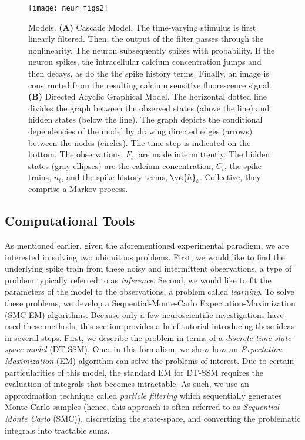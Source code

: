 \begin{figure}
\centering
\texttt{[image: neur\_figs2]}
\caption[Models]{Models.  \textbf{(A)} Cascade Model. The time-varying stimulus is first linearly filtered.  Then, the output of the filter passes through the nonlinearity.  The neuron subsequently spikes with probability.  If the neuron spikes, the intracellular calcium concentration jumps and then decays, as do the the spike history terms. Finally, an image is constructed from the resulting calcium sensitive fluorescence signal.  \textbf{(B)} Directed Acyclic Graphical Model. The horizontal dotted line divides the graph between the observed states (above the line) and hidden states (below the line). The graph depicts the conditional dependencies of the model by drawing directed edges (arrows) between the nodes (circles). The time step is indicated on the bottom.  The observations, $F_t$, are made intermittently. The hidden states (gray ellipses) are the calcium concentration, $C_t$, the spike trains, $n_t$, and the spike history terms, $\ve{h}_t$. Collective, they comprise a  Markov process.}
\label{fig:mod}
\end{figure}

\subsection{Computational Tools}

As mentioned earlier, given the aforementioned experimental paradigm, we are interested in solving two ubiquitous problems. First, we would like to find the underlying spike train from these noisy and intermittent observations, a type of problem typically referred to as \emph{inference}.  Second, we would like to fit the parameters of the model to the observations, a problem called \emph{learning}.  To solve these problems, we develop a Sequential-Monte-Carlo Expectation-Maximization (SMC-EM) algorithms. Because only a few neuroscientific investigations have used these methods\cite{GaoDonoghue02, BrockwellKass04, KellyLee04, SamejimaKimura04, HuysPaninski06b, Sanger07, ErgunBrown07}, this section provides a brief tutorial introducing these ideas in several steps.  First, we describe the problem in terms of a \emph{discrete-time state-space model} (DT-SSM).  Once in this formalism, we show how an \emph{Expectation-Maximization} (EM) algorithm can solve the problems of interest. Due to certain particularities of this model, the standard EM for DT-SSM requires the evaluation of integrals that becomes intractable.  As such, we use an approximation technique called \emph{particle filtering} which sequentially generates Monte Carlo samples (hence, this approach is often referred to as \emph{Sequential Monte Carlo} (SMC)), discretizing the state-space, and converting the problematic integrals into tractable sums.

